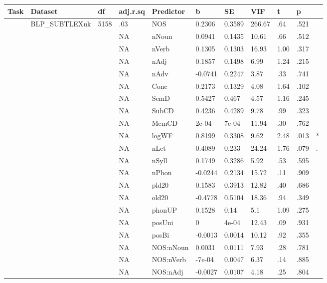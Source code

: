 \begin{table}[ht]
\centering
\begingroup\normalsize
\begin{tabular}{lllllllllll}
  \hline
Task & Dataset & df & adj.r.sq & Predictor & b & SE & VIF & t & p &  \\ 
  \hline
 & BLP\_SUBTLEXuk & 5158 & .03 & NOS & 0.2306 & 0.3589 & 266.67 & .64 & .521 &   \\ 
   &  &  & NA & nNoun & 0.0941 & 0.1435 & 10.61 & .66 & .512 &   \\ 
   &  &  & NA & nVerb & 0.1305 & 0.1303 & 16.93 & 1.00 & .317 &   \\ 
   &  &  & NA & nAdj & 0.1857 & 0.1498 & 6.99 & 1.24 & .215 &   \\ 
   &  &  & NA & nAdv & -0.0741 & 0.2247 & 3.87 & .33 & .741 &   \\ 
   &  &  & NA & Conc & 0.2173 & 0.1329 & 4.08 & 1.64 & .102 &   \\ 
   &  &  & NA & SemD & 0.5427 & 0.467 & 4.57 & 1.16 & .245 &   \\ 
   &  &  & NA & SubCD & 0.4236 & 0.4289 & 9.78 & .99 & .323 &   \\ 
   &  &  & NA & MemCD & 2e-04 & 7e-04 & 11.94 & .30 & .762 &   \\ 
   &  &  & NA & logWF & 0.8199 & 0.3308 & 9.62 & 2.48 & .013 & * \\ 
   &  &  & NA & nLet & 0.4089 & 0.233 & 24.24 & 1.76 & .079 & . \\ 
   &  &  & NA & nSyll & 0.1749 & 0.3286 & 5.92 & .53 & .595 &   \\ 
   &  &  & NA & nPhon & -0.0244 & 0.2134 & 15.72 & .11 & .909 &   \\ 
   &  &  & NA & pld20 & 0.1583 & 0.3913 & 12.82 & .40 & .686 &   \\ 
   &  &  & NA & old20 & -0.4778 & 0.5104 & 18.36 & .94 & .349 &   \\ 
   &  &  & NA & phonUP & 0.1528 & 0.14 & 5.1 & 1.09 & .275 &   \\ 
   &  &  & NA & posUni & 0 & 4e-04 & 12.43 & .09 & .931 &   \\ 
   &  &  & NA & posBi & -0.0013 & 0.0014 & 10.12 & .92 & .355 &   \\ 
   &  &  & NA & NOS:nNoun & 0.0031 & 0.0111 & 7.93 & .28 & .781 &   \\ 
   &  &  & NA & NOS:nVerb & -7e-04 & 0.0047 & 6.37 & .14 & .885 &   \\ 
   &  &  & NA & NOS:nAdj & -0.0027 & 0.0107 & 4.18 & .25 & .804 &   \\ 

\end{tabular}
\end{table}
